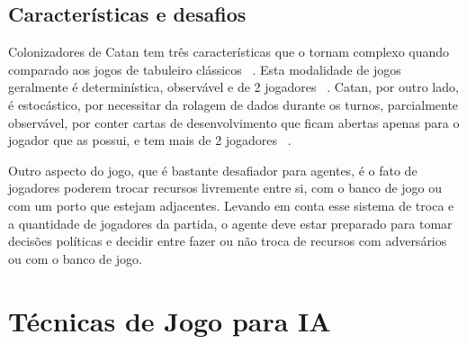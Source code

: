
\subsection{\label{sec:secao2.2}Características e desafios}

Colonizadores de Catan tem três características que o tornam complexo quando comparado aos jogos de tabuleiro clássicos ~\cite{MONTECARLOCATAN01}. Esta modalidade de jogos geralmente é determinística, observável e de 2 jogadores ~\cite{MONTECARLOFRAMEWORK}. Catan, por outro lado, é estocástico, por necessitar da rolagem de dados durante os turnos, parcialmente observável, por conter cartas de desenvolvimento que ficam abertas apenas para o jogador que as possui, e tem mais de 2 jogadores ~\cite{MONTECARLOCATAN01}.

Outro aspecto do jogo, que é bastante desafiador para agentes, é o fato de jogadores poderem trocar recursos livremente entre si, com o banco de jogo ou com um porto que estejam adjacentes. Levando em conta esse sistema de troca e a quantidade de jogadores da partida, o agente deve estar preparado para tomar decisões políticas e decidir entre fazer ou não troca de recursos com adversários ou com o banco de jogo.






\section{\label{sec:secao3}Técnicas de Jogo para IA}

